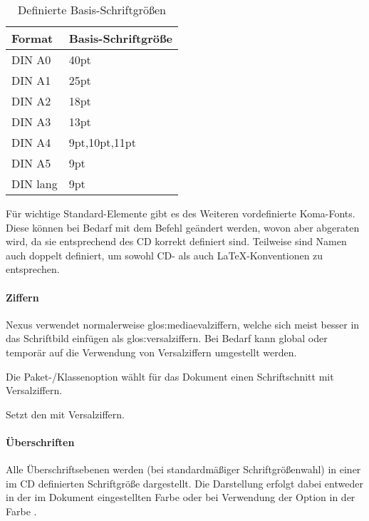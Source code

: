 \begin{table}\centering
\begin{tabular}{ll}
  Format  & Basis-Schriftgröße  \\
  \midrule
  DIN A0  & 40pt \\
  DIN A1  & 25pt \\
  DIN A2  & 18pt \\
  DIN A3  & 13pt \\
  DIN A4  & 9pt,10pt,11pt \\
  DIN A5  & 9pt \\
  DIN lang& 9pt \\
\end{tabular}
\caption{Definierte Basis-Schriftgrößen}\label{table:fontsizes}
\end{table}


Für wichtige Standard-Elemente gibt es des Weiteren vordefinierte Koma-Fonts.
Diese können bei Bedarf mit dem Befehl  
geändert werden, wovon aber abgeraten wird, da sie entsprechend des CD korrekt
definiert sind. Teilweise sind Namen auch doppelt definiert, um sowohl
CD- als auch \LaTeX-Konventionen zu entsprechen.

\paragraph{Ziffern} Nexus verwendet normalerweise \gls{glos:mediaevalziffern}, welche
sich meist besser in das Schriftbild einfügen als \gls{glos:versalziffern}.
Bei Bedarf kann global oder temporär auf die Verwendung von Versalziffern
umgestellt werden.

\begin{Declaration}
\end{Declaration}
Die Paket-/Klassenoption  wählt für das Dokument einen Schriftschnitt mit
Versalziffern.

\begin{Declaration}
\end{Declaration}
Setzt den  mit Versalziffern.


\paragraph{Überschriften}

Alle Überschriftsebenen werden (bei standardmäßiger Schriftgrößenwahl)
in einer im CD definierten Schriftgröße dargestellt.
Die Darstellung erfolgt dabei entweder in der im Dokument eingestellten Farbe
oder bei Verwendung der Option  in der Farbe
.

